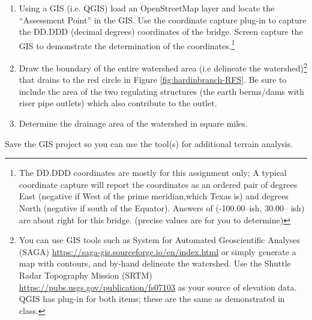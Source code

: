 \documentclass[12pt]{article}
\begin{document}
\begin{enumerate}
\item Using a GIS (i.e. QGIS) load an OpenStreetMap layer and locate the ``Assessment Point'' in the GIS.  Use the coordinate capture plug-in to capture the DD.DDD (decimal degrees) coordinates of the bridge.  Screen capture the GIS to demonstrate the determination of the coordinates.\footnote{The DD.DDD coordinates are mostly for this assignment only; A typical coordinate capture will report the coordinates as an ordered pair of degrees East (negative if West of the prime meridian,which Texas is) and degrees North (negative if south of the Equator).  Answers of (-100.00--ish, 30.00-- ish) are about right for this bridge. (precise values are for you to determine)}

\item Draw the boundary of the entire watershed area (i.e delineate the watershed)\footnote{You can use GIS tools such as System for Automated Geoscientific Analyses (SAGA) \url{https://saga-gis.sourceforge.io/en/index.html} or simply generate a map with contours, and by-hand delineate the watershed.  Use the Shuttle Radar Topography Mission (SRTM) \url{https://pubs.usgs.gov/publication/fs07103} as your source of elevation data.  QGIS has plug-in for both items; these are the same as demonstrated in class.} that drains to the red circle in Figure \ref{fig:hardinbranch-RFS}. Be sure to include the area of the two regulating structures (the earth berms/dams with riser pipe outlets) which also contribute to the outlet.

\item Determine the drainage area of the watershed in square miles.

\end{enumerate}

Save the GIS project so you can use the tool(s) for additional terrain analysis.
\end{document}
